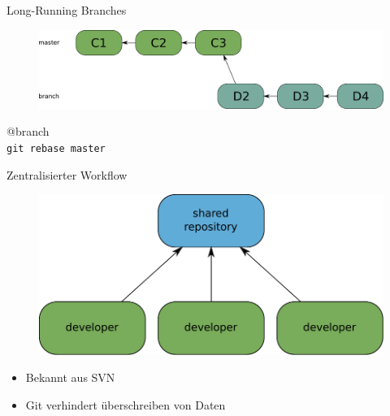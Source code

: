 \begin{frame}{Long-Running Branches}
\begin{figure} 
\centering
  \includegraphics[scale=0.4]{images/long-running-branch3.pdf}
\end{figure}
\begin{tiny}
\pause @branch \\
\pause \texttt{git rebase master} \\
\end{tiny}

\end{frame}


\begin{frame}{Zentralisierter Workflow}
\begin{figure} 
\centering
\includegraphics[scale=0.6]{images/centralized-workflow.pdf}
\end{figure}
\begin{itemize}
\pause \item Bekannt aus SVN
\pause \item Git verhindert überschreiben von Daten
\end{itemize}
\end{frame}


